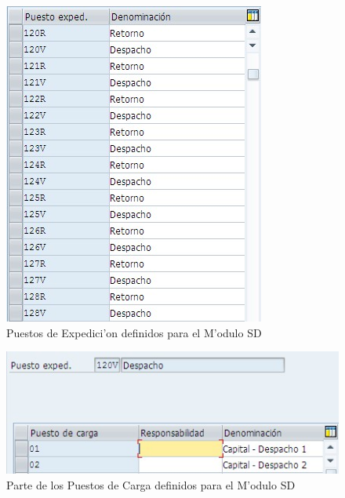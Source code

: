 \begin{figure}[htb]
\centering
\includegraphics[scale=0.65,type=jpg,ext=.jpg,read=.jpg]{figures/PuestosExpedicion}
\caption{Puestos de Expedici'on definidos para el M'odulo SD}
\label{fig:expedicion}
\end{figure}
\begin{figure}[htb]
\centering
\includegraphics[scale=0.65,type=jpg,ext=.jpg,read=.jpg]{figures/PuestoCarga}
\caption{Parte de los Puestos de Carga definidos para el M'odulo SD}
\label{fig:carga}
\end{figure}
